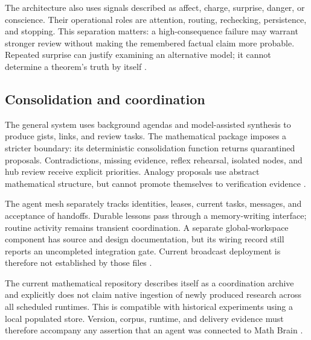 The architecture also uses signals described as affect, charge, surprise, danger, or conscience. Their operational roles are attention, routing, rechecking, persistence, and stopping. This separation matters: a high-consequence failure may warrant stronger review without making the remembered factual claim more probable. Repeated surprise can justify examining an alternative model; it cannot determine a theorem's truth by itself \citep{broadarchitecture,canonical,reconsolidation}.

\subsection{Consolidation and coordination}

The general system uses background agendas and model-assisted synthesis to produce gists, links, and review tasks. The mathematical package imposes a stricter boundary: its deterministic consolidation function returns quarantined proposals. Contradictions, missing evidence, reflex rehearsal, isolated nodes, and hub review receive explicit priorities. Analogy proposals use abstract mathematical structure, but cannot promote themselves to verification evidence \citep{consolidation}.

The agent mesh separately tracks identities, leases, current tasks, messages, and acceptance of handoffs. Durable lessons pass through a memory-writing interface; routine activity remains transient coordination. A separate global-workspace component has source and design documentation, but its wiring record still reports an uncompleted integration gate. Current broadcast deployment is therefore not established by those files \citep{mesh,globalworkspace}.

The current mathematical repository describes itself as a coordination archive and explicitly does not claim native ingestion of newly produced research across all scheduled runtimes. This is compatible with historical experiments using a local populated store. Version, corpus, runtime, and delivery evidence must therefore accompany any assertion that an agent was connected to Math Brain \citep{mathreadme}.
